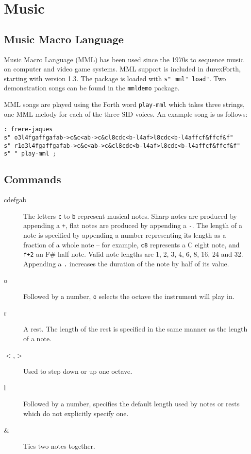 \chapter{Music}

\section{Music Macro Language}

Music Macro Language (MML) has been used since the 1970s to sequence music on computer and video game systems. MML support is included in durexForth, starting with version 1.3. The package is loaded with \texttt{s" mml" load"}. Two demonstration songs can be found in the \texttt{mmldemo} package.

MML songs are played using the Forth word \texttt{play-mml} which takes three strings, one MML melody for each of the three SID voices. An example song is as follows:

\begin{verbatim}
: frere-jaques
s" o3l4fgaffgafab->c&c<ab->c&cl8cdc<b-l4af>l8cdc<b-l4affcf&ffcf&f"
s" r1o3l4fgaffgafab->c&c<ab->c&cl8cdc<b-l4af>l8cdc<b-l4affcf&ffcf&f"
s" " play-mml ;
\end{verbatim}

\section{Commands}

\begin{description}
\item[cdefgab] The letters \texttt{c} to \texttt{b} represent musical notes. Sharp notes are produced by appending a \texttt{+}, flat notes are produced by appending a \texttt{-}. The length of a note is specified by appending a number representing its length as a fraction of a whole note -- for example, \texttt{c8} represents a C eight note, and \texttt{f+2} an F\# half note. Valid note lengths are 1, 2, 3, 4, 6, 8, 16, 24 and 32. Appending a \texttt{.} increases the duration of the note by half of its value.
\item[o] Followed by a number, \texttt{o} selects the octave the instrument will play in.
\item[r] A rest. The length of the rest is specified in the same manner as the length of a note.
\item[$<$,$>$] Used to step down or up one octave.
\item[l] Followed by a number, specifies the default length used by notes or rests which do not explicitly specify one.
\item[\&] Ties two notes together.
\end{description}
